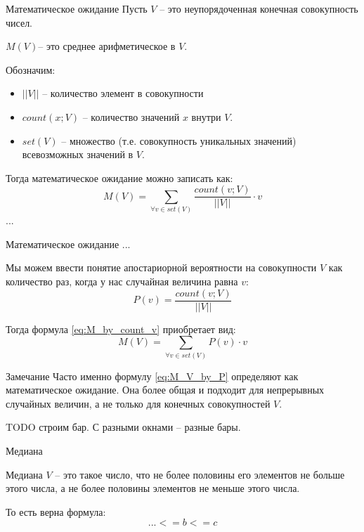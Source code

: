 \begin{frame}{Математическое ожидание}
	Пусть $V$ -- это неупорядоченная конечная совокупность чисел.
	
	 $M(V)$-- это среднее арифметическое в $V$.
	
	Обозначим:
	\begin{itemize}
		\item $||V||$ -- количество элемент в совокупности
		\item $count(x;V)$ -- количество значений $x$ внутри $V$.
		\item $set(V)$ -- множество (т.е. совокупность уникальных значений) всевозможных значений в $V$.
	\end{itemize}
	
	Тогда математическое ожидание можно записать как:
	\begin{equation}\label{eq:M_by_count_v}
	M(V) = \sum_{\forall v \in set(V)} \frac{count(v;V)}{||V||} \cdot v 
	\end{equation}
	...
\end{frame}
\begin{frame}{Математическое ожидание}
	\small
	...
	
	Мы можем ввести понятие апостариорной вероятности на совокупности $V$ как количество раз, когда 
	у нас случайная величина равна $v$:
	\begin{equation}
	P(v) = \frac{count(v;V)}{||V||}
	\end{equation}
	
	Тогда формула \eqref{eq:M_by_count_v} приобретает вид:
	\begin{equation}\label{eq:M_V_by_P}
	M(V) = \sum_{\forall v \in set(V)} P(v) \cdot v
	\end{equation}
	
	\begin{block}{Замечание}
		Часто именно формулу \eqref{eq:M_V_by_P} определяют как 
		математическое ожидание. Она более общая и подходит для непрерывных случайных величин, 
		а не только для конечных совокупностей $V$.
	\end{block}	
\end{frame}

\begin{frame}
	TODO строим бар. С разными окнами -- разные бары.
\end{frame}

\begin{frame}{Медиана}
	
	Медиана $V$ -- это такое число, что не более половины его элементов не больше этого числа, а не более половины элементов не меньше этого числа.
	
	То есть верна формула:
	\begin{equation}
	... <= b <= c
	\end{equation}
	
\end{frame}


